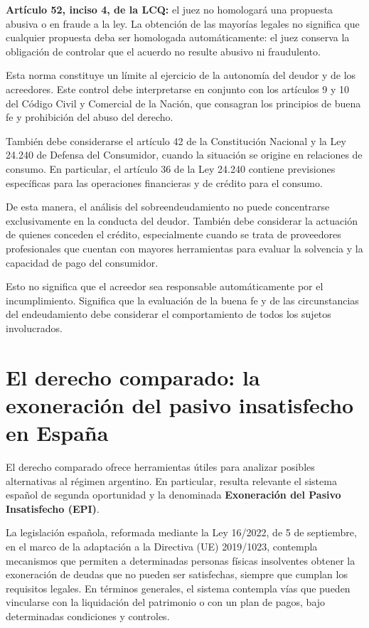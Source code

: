 \documentclass[12pt,oneside]{book}
\begin{document}
\begin{important}
\textbf{Artículo 52, inciso 4, de la LCQ:} el juez no homologará una propuesta abusiva o en fraude a la ley. La obtención de las mayorías legales no significa que cualquier propuesta deba ser homologada automáticamente: el juez conserva la obligación de controlar que el acuerdo no resulte abusivo ni fraudulento.
\end{important}

Esta norma constituye un límite al ejercicio de la autonomía del deudor y de los acreedores. Este control debe interpretarse en conjunto con los artículos 9 y 10 del Código Civil y Comercial de la Nación, que consagran los principios de buena fe y prohibición del abuso del derecho.

También debe considerarse el artículo 42 de la Constitución Nacional y la Ley 24.240 de Defensa del Consumidor, cuando la situación se origine en relaciones de consumo. En particular, el artículo 36 de la Ley 24.240 contiene previsiones específicas para las operaciones financieras y de crédito para el consumo.

De esta manera, el análisis del sobreendeudamiento no puede concentrarse exclusivamente en la conducta del deudor. También debe considerar la actuación de quienes conceden el crédito, especialmente cuando se trata de proveedores profesionales que cuentan con mayores herramientas para evaluar la solvencia y la capacidad de pago del consumidor.

Esto no significa que el acreedor sea responsable automáticamente por el incumplimiento. Significa que la evaluación de la buena fe y de las circunstancias del endeudamiento debe considerar el comportamiento de todos los sujetos involucrados.

\section{El derecho comparado: la exoneración del pasivo insatisfecho en España}

El derecho comparado ofrece herramientas útiles para analizar posibles alternativas al régimen argentino. En particular, resulta relevante el sistema español de segunda oportunidad y la denominada \textbf{Exoneración del Pasivo Insatisfecho (EPI)}.

La legislación española, reformada mediante la Ley 16/2022, de 5 de septiembre, en el marco de la adaptación a la Directiva (UE) 2019/1023, contempla mecanismos que permiten a determinadas personas físicas insolventes obtener la exoneración de deudas que no pueden ser satisfechas, siempre que cumplan los requisitos legales. En términos generales, el sistema contempla vías que pueden vincularse con la liquidación del patrimonio o con un plan de pagos, bajo determinadas condiciones y controles.
\end{document}
